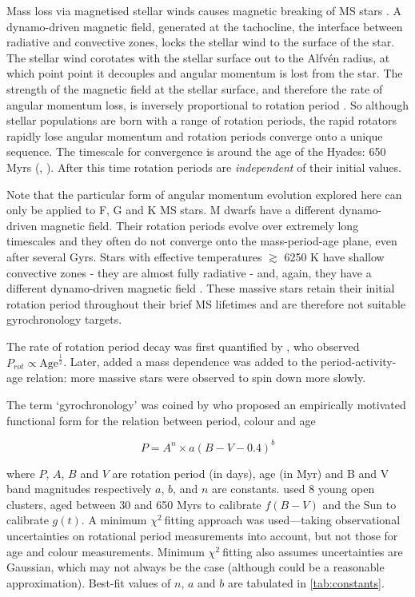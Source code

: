 \documentclass[10pt,preprint]{aastex}
\newcommand{\chit}{$\chi^2~$}
\begin{document}
Mass loss via magnetised stellar winds causes magnetic breaking of MS stars \citep{Weber1967}.
A dynamo-driven magnetic field, generated at the tachocline, the interface between radiative and convective zones, locks the stellar wind to the surface of the star.
The stellar wind corotates with the stellar surface out to the Alfv\'{e}n radius, at which point point it decouples and angular momentum is lost from the star.
The strength of the magnetic field at the stellar surface, and therefore the rate of angular momentum loss, is inversely proportional to rotation period \citep{Kawaler1988}.
So although stellar populations are born with a range of rotation periods, the rapid rotators rapidly lose angular momentum and rotation periods converge onto a unique sequence.
The timescale for convergence is around the age of the Hyades: 650 Myrs (\citealt{Radick1987}, \citealt{Irwin2009}).
After this time rotation periods are \emph{independent} of their initial values.

Note that the particular form of angular momentum evolution explored here can only be applied to F, G and K MS stars.
M dwarfs have a different dynamo-driven magnetic field.
Their rotation periods evolve over extremely long timescales and they often do not converge onto the mass-period-age plane, even after several Gyrs.
Stars with effective temperatures $\gtrsim$ 6250 K have shallow convective zones - they are almost fully radiative - and, again, they have a different dynamo-driven magnetic field \citep{Kraft1967}.
These massive stars retain their initial rotation period throughout their brief MS lifetimes and are therefore not suitable gyrochronology targets.

The rate of rotation period decay was first quantified by \citet{Skumanich1972}, who observed $P_{rot} \propto \mathrm{Age}^{\frac{1}{2}}$.
Later, \citet{Noyes1984_2} added a mass dependence was added to the period-activity-age relation: more massive stars were observed to spin down more slowly.

The term `gyrochronology' was coined by \citet{Barnes2003} who proposed an empirically motivated functional form for the relation between period, colour and age

\begin{equation}
P = A^n \times a(B-V-0.4)^b
\label{eq:Barnes2007_2}
\end{equation}

where $P$, $A$, $B$ and $V$ are rotation period (in days), age (in Myr) and B and V band magnitudes respectively
$a$, $b$, and $n$ are constants.
\citet{Barnes2007} used 8 young open clusters, aged between 30 and 650 Myrs to calibrate $f(B-V)$ and the Sun to calibrate $g(t)$.
A minimum \chit fitting approach was used---taking observational uncertainties on rotational period measurements into account, but not those for age and colour measurements.
Minimum \chit fitting also assumes uncertainties are Gaussian, which may not always be the case (although could be a reasonable approximation).
Best-fit values of $n$, $a$ and $b$ are tabulated in \ref{tab:constants}.
\end{document}
